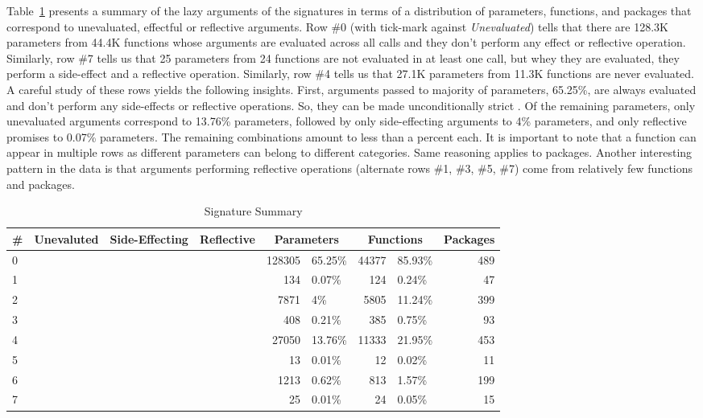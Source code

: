 \documentclass[review,nonacm,screen,acmsmall,anonymous=true]{acmart}
\newcommand{\xmark}{\textcolor{red}{\ding{55}}}
\newcommand{\cmark}{\textcolor{green}{\ding{51}}}
\begin{document}
Table~\ref{table:strictdist} presents a summary of the lazy arguments of the
signatures in terms of a distribution of parameters, functions, and packages
that correspond to unevaluated, effectful or reflective arguments. Row \#0 (with
tick-mark against \emph{Unevaluated}) tells that there are 128.3K parameters
from 44.4K functions whose arguments are evaluated across all calls and they
don't perform any effect or reflective operation. Similarly, row \#7 tells us
that 25 parameters from 24 functions are not evaluated in at least one call, but
whey they are evaluated, they perform a side-effect and a reflective operation.
Similarly, row \#4 tells us that 27.1K parameters from 11.3K functions are never
evaluated. A careful study of these rows yields the following insights. First,
arguments passed to majority of parameters, 65.25\%, are always evaluated and
don't perform any side-effects or reflective operations. So, they can be made
unconditionally strict . Of the remaining parameters, only unevaluated arguments
correspond to 13.76\% parameters, followed by only side-effecting arguments to
4\% parameters, and only reflective promises to 0.07\% parameters. The remaining
combinations amount to less than a percent each. It is important to note that a
function can appear in multiple rows as different parameters can belong to
different categories. Same reasoning applies to packages. Another interesting
pattern in the data is that arguments performing reflective operations
(alternate rows \#1, \#3, \#5, \#7) come from relatively few functions and
packages.
%
\begin{table}
  \vspace{-3mm}
  \small
  \caption{Signature Summary} \label{table:strictdist}
  \centering
  \begin{tabular}{lcccr|lr|lr}
    \toprule
    \#&\bf Unevaluted & \bf Side-Effecting & \bf Reflective & \multicolumn{2}{c}{\textbf{Parameters}} & \multicolumn{2}{c}{\textbf{Functions}}& \bf Packages\\
    \midrule
    0&\xmark{}&\xmark{}&\xmark{}&128305&65.25\%&44377&85.93\%&489\\
    1&\xmark{}&\xmark{}&\cmark{}&134&0.07\%&124&0.24\%&47\\
    2&\xmark{}&\cmark{}&\xmark{}&7871&4\%&5805&11.24\%&399\\
    3&\xmark{}&\cmark{}&\cmark{}&408&0.21\%&385&0.75\%&93\\
    4&\cmark{}&\xmark{}&\xmark{}&27050&13.76\%&11333&21.95\%&453\\
    5&\cmark{}&\xmark{}&\cmark{}&13&0.01\%&12&0.02\%&11\\
    6&\cmark{}&\cmark{}&\xmark{}&1213&0.62\%&813&1.57\%&199\\
    7&\cmark{}&\cmark{}&\cmark{}&25&0.01\%&24&0.05\%&15\\
    \bottomrule
  \end{tabular}
\end{table}
\end{document}
